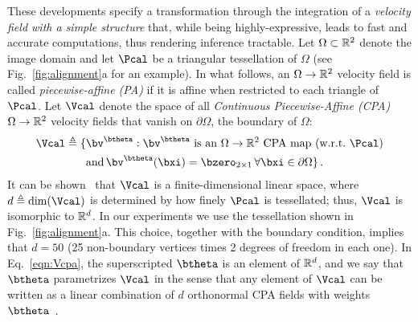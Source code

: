 \documentclass[twoside]{article}
\begin{document}
    These developments specify a transformation through the integration of a \emph{velocity field
    with a simple structure} that, while being highly-expressive, leads to fast
    and accurate computations, thus rendering inference tractable.
    Let $\Omega\subset\mathbb{R}^2$ denote the image domain and let $\Pcal$ be a
    triangular tessellation of $\Omega$ (see Fig.~\ref{fig:alignment}a for an example).
    In what follows, an $\Omega \to \mathbb{R}^2$ velocity field is called
    \emph{piecewise-affine (PA)} if it is affine when restricted to each triangle
    of $\Pcal$. Let $\Vcal$ denote the space of all \emph{Continuous Piecewise-Affine (CPA)}$\Omega \to \mathbb{R}^2$ velocity fields that vanish on $\partial\Omega$, the boundary
    of $\Omega$:
    \begin{align}\label{eqn:Vcpa}
    \begin{split}
      \Vcal \triangleq \{&\bv^\btheta: \bv^\btheta \text{ is an } \Omega\to\Rtwo \text{ CPA map (w.r.t.~}\Pcal\text{)}  \\
               &\text{and} \, \bv^\btheta(\bxi)=\bzero_{2\times1}\,  \forall \bxi\in\partial\Omega
              \} \, .
    \end{split}
    \end{align}%
    It can be shown~\cite{freifeld2015transform} that $\Vcal$ is a finite-dimensional linear space, where
    $d \triangleq \dim(\Vcal)$ is determined by how finely $\Pcal$ is tessellated; thus, $\Vcal$ is isomorphic to $\mathbb{R}^d$.
    In our experiments we use the tessellation shown
    in Fig.~\ref{fig:alignment}a. 
    This choice, together with the boundary condition, implies that $d = 50$
    (25 non-boundary vertices times 2 degrees of freedom in each one).
    In Eq.~\ref{eqn:Vcpa}, the superscripted $\btheta$ is an element 
    of $\mathbb{R}^d$, and we say that $\btheta$ parametrizes $\Vcal$ in the sense 
    that any element of $\Vcal$ can be written as a linear combination of $d$
    orthonormal CPA fields with weights $\btheta$~\cite{freifeld2015transform}.
    
\end{document}
